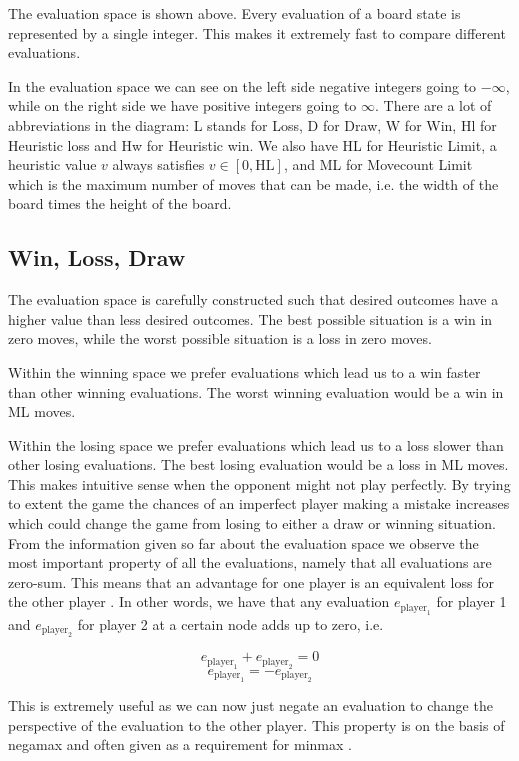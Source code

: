 \documentclass[a4paper]{article}
\begin{document}
The evaluation space is shown above. Every evaluation of a board
state is represented by a single integer. This makes it extremely fast to
compare different evaluations.

In the evaluation space we can see on the left side negative integers going to
$-\infty$, while on the right side we have positive integers going to $\infty$.
There are a lot of abbreviations in the diagram: L stands for Loss, D for Draw,
W for Win, Hl for Heuristic loss and Hw for Heuristic win. We also have HL for
Heuristic Limit, a heuristic value $v$ always satisfies $v \in [0,
\text{HL}]$, and ML for Movecount Limit which is the maximum number of moves
that can be made, i.e. the width of the board times the height of the board.

\subsection{Win, Loss, Draw}
The evaluation space is carefully constructed such that desired outcomes have a
higher value than less desired outcomes. The best possible situation is a win
in zero moves, while the worst possible situation is a loss in zero moves.

Within the winning space we prefer evaluations which lead us to a win faster
than other winning evaluations. The worst winning evaluation would be a win in
ML moves.

Within the losing space we prefer evaluations which lead us to a loss slower
than other losing evaluations. The best losing evaluation would be a loss in ML
moves. This makes intuitive sense when the opponent might not play perfectly.
By trying to extent the game the chances of an imperfect player making a
mistake increases which could change the game from losing to either a draw or
winning situation.
\\

\noindent
From the information given so far about the evaluation space we observe the
most important property of all the evaluations, namely that all evaluations are
zero-sum. This means that an advantage for one player is an equivalent loss for
the other player \cite{wiki:zero_sum}. In other words, we have that any
evaluation $e_{\text{player}_1}$ for player 1 and $e_{\text{player}_2}$ for
player 2 at a certain node adds up to zero, i.e.

$$e_{\text{player}_1} + e_{\text{player}_2} = 0$$
$$e_{\text{player}_1} = -e_{\text{player}_2}$$

This is extremely useful as we can now just negate an evaluation to change the
perspective of the evaluation to the other player. This property is on the
basis of negamax and often given as a requirement for minmax \cite{wiki:minmax}.
\\
\end{document}
